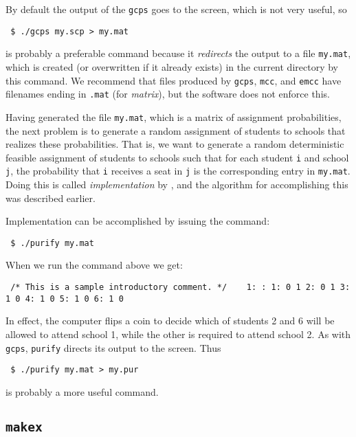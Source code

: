 \documentclass[12pt]{article}
\theoremstyle{definition}
\begin{document}
By default the output of the \texttt{gcps} goes to the screen, which
is not very useful, so 
\begin{obeylines}
  \texttt{
    \$ ./gcps my.scp > my.mat
    }
\end{obeylines}
\bigskip \noindent is probably a preferable command because it
\emph{redirects} the output to a file \texttt{my.mat}, which is
created (or overwritten if it already exists) in the current directory
by this command.  We recommend that files produced by \texttt{gcps},
\texttt{mcc}, and \texttt{emcc} have filenames ending in \texttt{.mat}
(for \emph{matrix}), but the software does not enforce this.

Having generated the file \texttt{my.mat}, which is a matrix of
assignment probabilities, the next problem is to generate a random
assignment of students to schools that realizes these probabilities.
That is, we want to generate a random deterministic feasible
assignment of students to schools such that for each student
\texttt{i} and school \texttt{j}, the probability that \texttt{i}
receives a seat in \texttt{j} is the corresponding entry in
\texttt{my.mat}.  Doing this is called \emph{implementation} by
\cite{bckm13aer}, and the algorithm for accomplishing this was
described earlier.

Implementation can be accomplished by issuing the command:
\begin{obeylines}
  \texttt{
    \$ ./purify my.mat 
    }
\end{obeylines}
\bigskip \noindent When we run the command above we get:
\begin{obeylines}\texttt{
/* This is a sample introductory comment. */
    \ \ \      1: \!\!\!\!:
   1:    0    1
   2:    0    1
   3:    1    0
   4:    1    0
   5:    1    0
   6:    1    0
}
\end{obeylines} \noindent
In effect, the computer flips a coin to decide which of students 2 and
6 will be allowed to attend school 1, while the other is required to
attend school 2.  As with \texttt{gcps}, \texttt{purify} directs its
output to the screen.  Thus
\begin{obeylines}
  \texttt{
    \$ ./purify my.mat > my.pur
    }
\end{obeylines}
\bigskip \noindent
is probably a more useful command.

\subsection{\texttt{makex}} \label{subsec:Makex}
\end{document}
